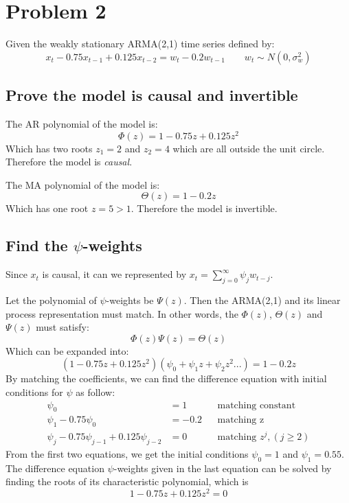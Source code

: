 \section{Problem 2}
Given the weakly stationary ARMA(2,1) time series defined by:
\begin{equation}
x_t - 0.75x_{t-1} + 0.125x_{t-2} = w_t -0.2w_{t-1} \qquad w_t \sim N(0, \sigma_w^2)
\end{equation}
\subsection{Prove the model is causal and invertible}
The AR polynomial of the model is:
\begin{equation}
\Phi(z) = 1-0.75z+0.125z^2
\end{equation}
Which has two roots $z_1 = 2$ and $z_2 = 4$ which are all outside the unit circle. Therefore the model is \emph{causal}.

The MA polynomial of the model is:
\begin{equation}
\Theta(z) = 1 - 0.2z
\end{equation}
Which has one root $z = 5 > 1$. Therefore the model is invertible.

\subsection{Find the $\psi$-weights}
Since $x_t$ is causal, it can we represented by $x_t = \sum_{j=0}^{\infty} \psi_jw_{t-j}$. 

Let the polynomial of $\psi$-weights be $\Psi(z)$. Then the ARMA(2,1) and its linear process representation must match. In other words, the $\Phi(z)$, $\Theta(z)$ and $\Psi(z)$ must satisfy:
\begin{equation}
 \Phi(z)\Psi(z) = \Theta(z)
\end{equation}
Which can be expanded into:
\begin{equation}
(1-0.75z+0.125z^2)(\psi_0 + \psi_1z+\psi_2z^2...) = 1-0.2z
\end{equation}
By matching the coefficients, we can find the difference equation with initial conditions for $\psi$ as follow:
\begin{align*}
\psi_0 &= 1  && \text{matching constant}\\
\psi_1 - 0.75 \psi_0 &= -0.2 && \text{matching z}\\
\psi_j - 0.75 \psi_{j-1}+0.125\psi_{j-2} &= 0 &&\text{matching }z^j, (j \geq 2)
\end{align*}
From the first two equations, we get the initial conditions $\psi_0 = 1$ and $\psi_1 = 0.55$. The difference equation $\psi$-weights given in the last equation can be solved by finding the roots of its characteristic polynomial, which is 
\begin{equation}
1-0.75z+0.125z^2 = 0
\end{equation}

